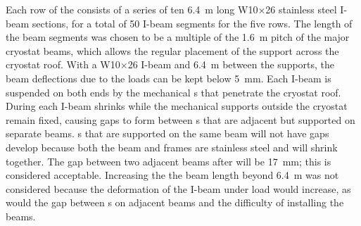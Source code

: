 Each row of the  consists of a series of ten  \SI{6.4}{m} long
W10$\times$26 stainless steel I-beam sections, for a total of \num{50} I-beam segments for the five rows. The length of the beam segments was chosen to be a multiple of the \SI{1.6}{m} pitch of the major cryostat beams, which allows the regular placement of the support \fdth across the cryostat roof. With a W10$\times$26 I-beam and \SI{6.4}{m} between the supports,  the beam deflections due to the loads can be kept below \SI{5}{mm}. 
Each I-beam is suspended on both ends by the mechanical \fdth{}s that penetrate the cryostat roof. 
During \cooldown  each I-beam shrinks while the mechanical supports outside the cryostat remain fixed,  causing gaps to form between s that are adjacent but supported on separate beams.
s that are supported on the same beam will not have gaps develop because both the beam and  frames are stainless steel and will shrink together.
The gap between two adjacent  beams after \cooldown will be \SI{17}{mm}; this is considered acceptable. 
Increasing the the beam length beyond \SI{6.4}{m} was not considered because the deformation of the I-beam under load would increase, as would the gap between s on adjacent beams and the difficulty of installing the beams. 



